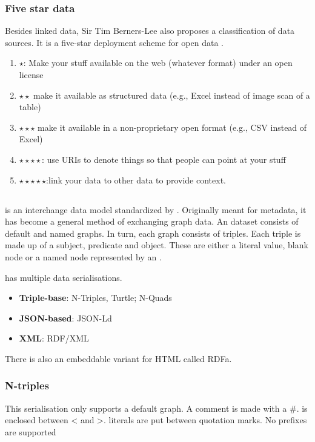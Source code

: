 \subsubsection{Five star data}
Besides linked data, Sir Tim Berners-Lee also proposes a classification of data sources. It is a five-star deployment scheme for open data \cite{noauthor_5-star_nodate}.

\begin{enumerate}
    \item $\star$: Make your stuff available on the web (whatever format) under an open license
    \item $\star\star$ make it available as structured data (e.g., Excel instead of image scan of a table)
    \item $\star\star\star$ make it available in a non-proprietary open format (e.g., CSV instead of Excel)
    \item $\star\star\star\star$: use URIs to denote things so that people can point at your stuff
    \item $\star\star\star\star\star$:link your data to other data to provide context.
\end{enumerate}
\subsection{}
 is an interchange data  model standardized by . Originally meant for metadata, it has become a general method of exchanging graph data. An  dataset consists of default and named graphs. In turn, each graph consists of  triples. Each triple is made up of a subject, predicate and object. These are either a literal value, blank node or a named node represented by an .

 has multiple data serialisations.
\begin{itemize}
    \item \textbf{Triple-base}: N-Triples, Turtle; N-Quads
    \item \textbf{JSON-based}: JSON-Ld
    \item \textbf{XML}: RDF/XML
\end{itemize}
There is also an embeddable variant for HTML called RDFa. 

\subsubsection{N-triples}
This serialisation only supports a default graph. A comment is made with a \#.  is enclosed between < and >. literals are put between quotation marks. No prefixes are supported
